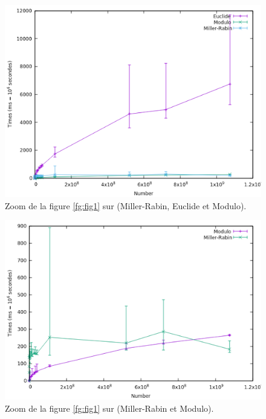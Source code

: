 \begin{frame}
\begin{figure}[!ht]	
		\begin{center}\includegraphics[scale=0.5]{Zoom2.png}\end{center}
		\caption{Zoom de la figure \ref{fg:fig1} sur (Miller-Rabin, Euclide et Modulo).}
		\label{fg:fig3}
\end{figure}
\end{frame}

\begin{frame}
	\begin{figure}[!ht]	
		\begin{center}\includegraphics[scale=0.5]{Zoom3.png}\end{center}
		\caption{Zoom de la figure \ref{fg:fig1} sur (Miller-Rabin et Modulo).}
		\label{fg:fig4}
	\end{figure}
\end{frame}
	
